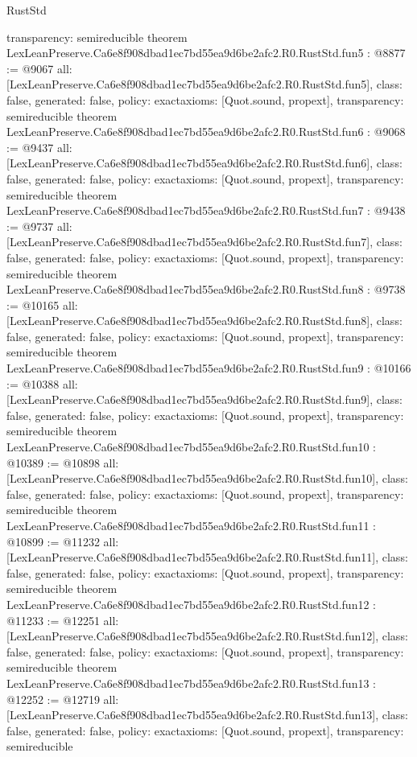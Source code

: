 \begin{lexlean}{RustStd}
\begin{coremodule}
{  transparency: semireducible
}
theorem LexLeanPreserve.Ca6e8f908dbad1ec7bd55ea9d6be2afc2.R0.RustStd.fun5 : @8877 := @9067 {
  all: [LexLeanPreserve.Ca6e8f908dbad1ec7bd55ea9d6be2afc2.R0.RustStd.fun5],
  class: false,
  generated: false,
  policy: exact{axioms: [Quot.sound, propext]},
  transparency: semireducible
}
theorem LexLeanPreserve.Ca6e8f908dbad1ec7bd55ea9d6be2afc2.R0.RustStd.fun6 : @9068 := @9437 {
  all: [LexLeanPreserve.Ca6e8f908dbad1ec7bd55ea9d6be2afc2.R0.RustStd.fun6],
  class: false,
  generated: false,
  policy: exact{axioms: [Quot.sound, propext]},
  transparency: semireducible
}
theorem LexLeanPreserve.Ca6e8f908dbad1ec7bd55ea9d6be2afc2.R0.RustStd.fun7 : @9438 := @9737 {
  all: [LexLeanPreserve.Ca6e8f908dbad1ec7bd55ea9d6be2afc2.R0.RustStd.fun7],
  class: false,
  generated: false,
  policy: exact{axioms: [Quot.sound, propext]},
  transparency: semireducible
}
theorem LexLeanPreserve.Ca6e8f908dbad1ec7bd55ea9d6be2afc2.R0.RustStd.fun8 : @9738 := @10165 {
  all: [LexLeanPreserve.Ca6e8f908dbad1ec7bd55ea9d6be2afc2.R0.RustStd.fun8],
  class: false,
  generated: false,
  policy: exact{axioms: [Quot.sound, propext]},
  transparency: semireducible
}
theorem LexLeanPreserve.Ca6e8f908dbad1ec7bd55ea9d6be2afc2.R0.RustStd.fun9 : @10166 := @10388 {
  all: [LexLeanPreserve.Ca6e8f908dbad1ec7bd55ea9d6be2afc2.R0.RustStd.fun9],
  class: false,
  generated: false,
  policy: exact{axioms: [Quot.sound, propext]},
  transparency: semireducible
}
theorem LexLeanPreserve.Ca6e8f908dbad1ec7bd55ea9d6be2afc2.R0.RustStd.fun10 : @10389 := @10898 {
  all: [LexLeanPreserve.Ca6e8f908dbad1ec7bd55ea9d6be2afc2.R0.RustStd.fun10],
  class: false,
  generated: false,
  policy: exact{axioms: [Quot.sound, propext]},
  transparency: semireducible
}
theorem LexLeanPreserve.Ca6e8f908dbad1ec7bd55ea9d6be2afc2.R0.RustStd.fun11 : @10899 := @11232 {
  all: [LexLeanPreserve.Ca6e8f908dbad1ec7bd55ea9d6be2afc2.R0.RustStd.fun11],
  class: false,
  generated: false,
  policy: exact{axioms: [Quot.sound, propext]},
  transparency: semireducible
}
theorem LexLeanPreserve.Ca6e8f908dbad1ec7bd55ea9d6be2afc2.R0.RustStd.fun12 : @11233 := @12251 {
  all: [LexLeanPreserve.Ca6e8f908dbad1ec7bd55ea9d6be2afc2.R0.RustStd.fun12],
  class: false,
  generated: false,
  policy: exact{axioms: [Quot.sound, propext]},
  transparency: semireducible
}
theorem LexLeanPreserve.Ca6e8f908dbad1ec7bd55ea9d6be2afc2.R0.RustStd.fun13 : @12252 := @12719 {
  all: [LexLeanPreserve.Ca6e8f908dbad1ec7bd55ea9d6be2afc2.R0.RustStd.fun13],
  class: false,
  generated: false,
  policy: exact{axioms: [Quot.sound, propext]},
  transparency: semireducible
}
\end{coremodule}
\end{lexlean}
